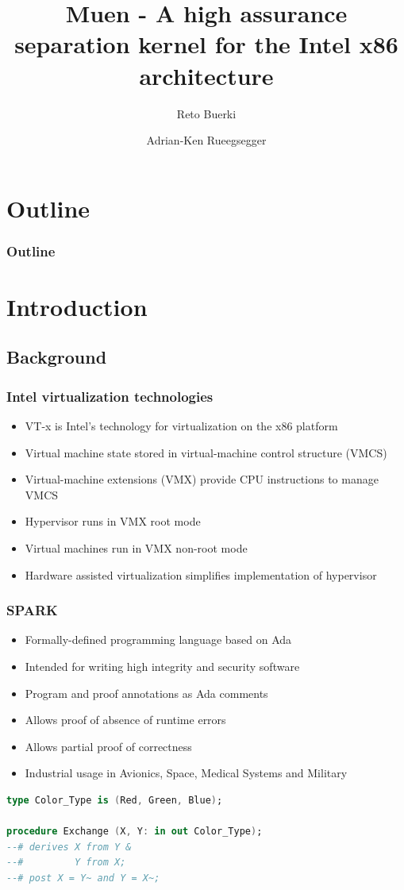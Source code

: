 \documentclass[xcolor={dvipsnames}]{beamer}
\title[Muen Separation Kernel]{Muen - A high assurance separation kernel for the Intel x86 architecture}
\author{Reto Buerki \and Adrian-Ken Rueegsegger}
\institute[HSR]
{
	Institute for Internet Technologies and Applications\\
	University of Applied Sciences Rapperswil
}
\begin{document}


\begin{frame}
	\titlepage
\end{frame}

\section*{Outline}
\begin{frame}
	\frametitle{Outline}\tableofcontents
\end{frame}

\section{Introduction}
\subsection{Background}
\begin{frame}\frametitle{Intel virtualization technologies}
\begin{itemize}
	\item VT-x is Intel's technology for virtualization on the x86 platform
	\item Virtual machine state stored in virtual-machine control structure (VMCS)
	\item Virtual-machine extensions (VMX) provide CPU instructions to manage VMCS
	\item Hypervisor runs in VMX root mode
	\item Virtual machines run in VMX non-root mode
	\item Hardware assisted virtualization simplifies implementation of hypervisor
\end{itemize}
\end{frame}

\begin{frame}[fragile]\frametitle{SPARK}
\begin{itemize}
	\item Formally-defined programming language based on Ada
	\item Intended for writing high integrity and security software
	\item Program and proof annotations as Ada comments
	\item Allows proof of absence of runtime errors
	\item Allows partial proof of correctness
	\item Industrial usage in Avionics, Space, Medical Systems and Military
\end{itemize}
\begin{lstlisting}[language=Ada]
type Color_Type is (Red, Green, Blue);

procedure Exchange (X, Y: in out Color_Type);
--# derives X from Y &
--#         Y from X;
--# post X = Y~ and Y = X~;
\end{lstlisting}
\end{frame}
\end{document}
